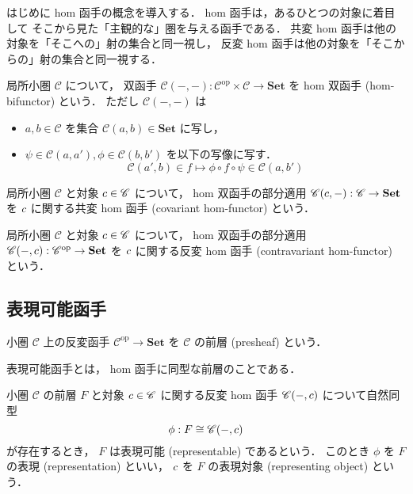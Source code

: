 \documentclass[titlepage]{ltjsreport}
\newcommand{\cat}[1]{\mathscr{#1}}
\newcommand{\obj}[1]{\lowercase{#1}}
\newcommand{\objs}[1]{#1}
\newcommand{\mrp}[3]{{#1}:{#2}\to{#3}}
\newcommand{\mrps}[3]{#1(#2,#3)}
\newcommand{\op}[1]{{#1}^{\mathrm{op}}}
\newcommand{\set}{\mathbf{Set}}
\begin{document}
はじめに hom 函手の概念を導入する．
hom 函手は，あるひとつの対象に着目して
そこから見た「主観的な」圏を与える函手である．
共変 hom 函手は他の対象を「そこへの」射の集合と同一視し，
反変 hom 函手は他の対象を「そこからの」射の集合と同一視する．
\begin{definition}
  \def\C{\cat{C}}%
  局所小圏 $\C$ について，
  双函手 $\mrp{\C(-,-)}{\op{\C}\times\C}{\set}$
  を hom 双函手 (hom-bifunctor) という．
  ただし $\mrps{\C}{-}{-}$ は
  \begin{itemize}
    \item $a,b\in\C$ を集合 $\mrps{\C}{a}{b}\in\set$ に写し，
    \item $\psi\in\mrps{\C}{a}{a'},\phi\in\mrps{\C}{b}{b'}$
          を以下の写像に写す．
          \begin{equation}
            \mrps{\C}{a'}{b}\in f\mapsto\phi\circ f\circ\psi\in\mrps{\C}{a}{b'}
          \end{equation}
  \end{itemize}
\end{definition}
\begin{definition}[共変 hom 函手]\label{def:covariant-hom-functor}
  \def\C{\cat{C}}%
  \def\c{\obj{c}}%
  局所小圏 $\C$ と対象 $\c\in\objs{\C}$ について，
  hom 双函手の部分適用 $\mrp{\mrps{\C}{\c}{-}}{\C}{\set}$ を
  $\c$ に関する共変 hom 函手 (covariant hom-functor) という．
\end{definition}
\begin{definition}[反変 hom 函手]
  \def\C{\cat{C}}%
  \def\c{\obj{c}}%
  局所小圏 $\C$ と対象 $\c\in\objs{\C}$ について，
  hom 双函手の部分適用 $\mrp{\mrps{\C}{-}{\c}}{\op{\C}}{\set}$ を
  $\c$ に関する反変 hom 函手 (contravariant hom-functor) という．
\end{definition}

\subsection{表現可能函手}

\begin{definition}[前層]
  \def\C{\cat{C}}%
  小圏 $\C$ 上の反変函手 $\op{\C}\to\set$ を
  $\C$ の前層 (presheaf) という．
\end{definition}

表現可能函手とは，
hom 函手に同型な前層のことである．

\begin{definition}[表現可能函手]
  \def\C{\cat{C}}%
  \def\c{\obj{c}}%
  \def\F{F}%
  \def\iso{\phi}%
  小圏 $\C$ の前層 $\F$ と対象 $\c\in\objs{\C}$
  に関する反変 hom 函手 $\mrps{\C}{-}{\c}$ について自然同型
  \begin{equation}
    \iso:\F\cong\mrps{\C}{-}{\c}
  \end{equation}
  が存在するとき，
  $\F$ は表現可能 (representable) であるという．
  このとき $\iso$ を $\F$ の表現 (representation) といい，
  $\c$ を $\F$ の表現対象 (representing object) という．
\end{definition}
\end{document}

